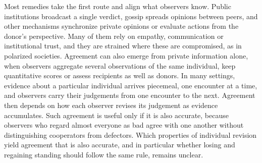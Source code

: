 Most remedies take the first route and align what observers know. Public institutions broadcast a single verdict\cite{radzvilavicius2021}, gossip spreads opinions between peers\cite{sommerfeld2007,kawakatsu2024}, and other mechanisms synchronize private opinions\cite{murase2024synchronization} or evaluate actions from the donor's perspective\cite{radzvilavicius2019}. Many of them rely on empathy, communication or institutional trust, and they are strained where these are compromised, as in polarized societies\cite{iyengar2019,michelmata2024}. Agreement can also emerge from private information alone, when observers aggregate several observations of the same individual, keep quantitative scores or assess recipients as well as donors\cite{michelmata2024,schmid2023,tham2026}. In many settings, evidence about a particular individual arrives piecemeal, one encounter at a time, and observers carry their judgements from one encounter to the next. Agreement then depends on how each observer revises its judgement as evidence accumulates. Such agreement is useful only if it is also accurate, because observers who regard almost everyone as bad agree with one another without distinguishing cooperators from defectors. Which properties of individual revision yield agreement that is also accurate, and in particular whether losing and regaining standing should follow the same rule, remains unclear.
